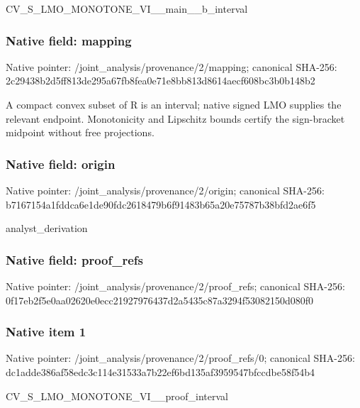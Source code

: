 \documentclass[10pt,a4paper]{article}
\begin{document}
\begingroup\raggedright\sloppy CV\_\allowbreak{}S\_\allowbreak{}LMO\_\allowbreak{}MONOTONE\_\allowbreak{}VI\_\allowbreak{}\_\allowbreak{}main\_\allowbreak{}\_\allowbreak{}b\_\allowbreak{}interval\par\endgroup

\subsubsection{Native field: mapping}
Native pointer: /joint\_\allowbreak{}analysis/provenance/2/mapping; canonical SHA-256: 2c29438b2d5ff813de295a67fb8fea0e71e8bb813d8614aecf608bc3b0b148b2

\begingroup\raggedright\sloppy A compact convex subset of R is an interval;\allowbreak{} native signed LMO supplies the relevant endpoint. Monotonicity and Lipschitz bounds certify the sign-bracket midpoint without free projections.\par\endgroup

\subsubsection{Native field: origin}
Native pointer: /joint\_\allowbreak{}analysis/provenance/2/origin; canonical SHA-256: b7167154a1fddca6e1de90fdc2618479b6f91483b65a20e75787b38bfd2ae6f5

\begingroup\raggedright\sloppy analyst\_\allowbreak{}derivation\par\endgroup

\subsubsection{Native field: proof\_\allowbreak{}refs}
Native pointer: /joint\_\allowbreak{}analysis/provenance/2/proof\_\allowbreak{}refs; canonical SHA-256: 0f17eb2f5e0aa02620e0ecc21927976437d2a5435c87a3294f53082150d080f0

\subsubsection{Native item 1}
Native pointer: /joint\_\allowbreak{}analysis/provenance/2/proof\_\allowbreak{}refs/0; canonical SHA-256: dc1adde386af58edc3c114e31533a7b22ef6bd135af3959547bfccdbe58f54b4

\begingroup\raggedright\sloppy CV\_\allowbreak{}S\_\allowbreak{}LMO\_\allowbreak{}MONOTONE\_\allowbreak{}VI\_\allowbreak{}\_\allowbreak{}proof\_\allowbreak{}interval\par\endgroup
\end{document}
